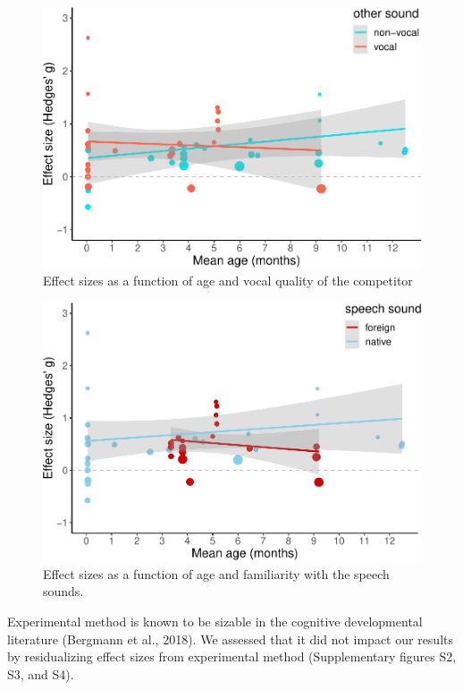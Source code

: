 \documentclass[man]{apa6}
\begin{document}
\begin{figure}
\centering
\includegraphics{MA_speech_pref_files/figure-latex/vocal-1.pdf}
\caption{\label{fig:vocal}Effect sizes as a function of age and vocal
quality of the competitor}
\end{figure}

\begin{figure}
\centering
\includegraphics{MA_speech_pref_files/figure-latex/unnamed-chunk-4-1.pdf}
\caption{\label{fig:unnamed-chunk-4}Effect sizes as a function of age and
familiarity with the speech sounds.}
\end{figure}

Experimental method is known to be sizable in the cognitive
developmental literature (Bergmann et al., 2018). We assessed that it
did not impact our results by residualizing effect sizes from
experimental method (Supplementary figures S2, S3, and S4).
\end{document}
